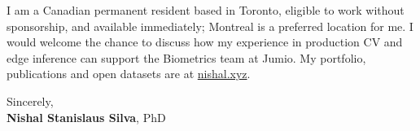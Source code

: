 \documentclass[11pt]{article}
\newcommand{\clName}{Nishal Stanislaus Silva}
\newcommand{\clCompany}{Jumio}
\newcommand{\clTeam}{the Biometrics team}
\begin{document}
I am a Canadian permanent resident based in Toronto, eligible to work without sponsorship, and available immediately; Montreal is a preferred location for me. I would welcome the chance to discuss how my experience in production CV and edge inference can support \clTeam{} at \clCompany{}. My portfolio, publications and open datasets are at \href{https://nishal.xyz}{nishal.xyz}.

\vspace{12pt}
Sincerely,\\[2pt]
\textbf{\clName}, PhD
\end{document}
